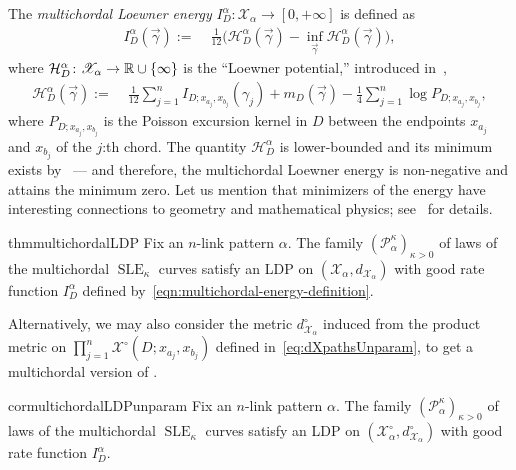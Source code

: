 \documentclass[a4paper, 11pt]{article}
\theoremstyle{definition}
\numberwithin{equation}{section}
\numberwithin{figure}{section}
\newcommand{\SLE}[1][]{\operatorname{SLE}_{#1}}
\newcommand{\lenergy}[2]{I_{#1;#2}}
\newcommand{\mcenergy}[2]{I_{#1}^{#2}}
\newcommand{\potential}[2]{\mathcal H_{#1}^{#2}}
\newcommand{\Pkernel}[2]{P_{#1;#2}}
\newcommand{\Hpaths}[1][]{\mathscr{X}_{#1}} %
\newcommand{\unparampathsH}{\Hpaths[]^\circ}%
\newcommand{\unparampathsHmulti}[1][]{\Hpaths[#1]^\circ}
\newcommand{\dHpaths}[1][]{d_{\!\Hpaths[#1]}}
\newcommand{\dHpathsUnparamMulti}[1][]{d_{\!\Hpaths[#1]}^\circ}
\newcommand{\mcMeasure}[2]{\mathscr{P}_{\!\!#1}^{#2}}
\newcommand{\loopterm}[1]{m_{#1}}
\begin{document}
The \emph{multichordal Loewner energy} $\mcenergy{D}{\alpha} \colon \Hpaths[\alpha] \to [0,+\infty]$ is defined as
\begin{align} \label{eqn:multichordal-energy-definition}
\mcenergy{D}{\alpha}(\vec \gamma) :=\;& \frac{1}{12} \big( \potential{D}{\alpha}(\vec \gamma) - \inf_{\vec\gamma}\potential{D}{\alpha}(\vec\gamma) \big) ,
\end{align}
where $\potential{D}{\alpha} \colon \Hpaths[\alpha] \to \bR\cup\{\infty\}$ is the ``Loewner potential,''
introduced in~\cite[Section~3.2]{Peltola-Wang:LDP},
\begin{align*}
\potential{D}{\alpha}(\vec\gamma) 
:= \;& \frac{1}{12}\sum_{j=1}^n \lenergy{D}{x_{a_j}, x_{b_j}}(\gamma_j) + \loopterm{D}(\vec\gamma) - \frac{1}{4} \sum_{j=1}^n\log \Pkernel{D}{x_{a_j}, x_{b_j}},
\end{align*}
where $\Pkernel{D}{x_{a_j}, x_{b_j}}$ is the Poisson excursion kernel in $D$ between the endpoints $x_{a_j}$ and $x_{b_j}$ of the $j$:th chord. 
The quantity $\potential{D}{\alpha}$ is lower-bounded and its minimum exists by~\cite[Proposition~3.13]{Peltola-Wang:LDP} 
--- and therefore, the multichordal Loewner energy is non-negative and attains the minimum zero.
Let us mention that minimizers of the energy have interesting connections to geometry and mathematical physics;  see~\cite{ABKM:Pole_dynamics_and_an_integral_of_motion_for_multiple_SLE0,Peltola-Wang:LDP} for details.

\begin{restatable}{thm}{multichordalLDP}\label{thm:multichordal-LDP}
Fix an $n$-link pattern $\alpha$. 
The family $(\mcMeasure{\alpha}{\kappa})_{\kappa > 0}$ of laws of the multichordal $\SLE[\kappa]$ curves 
satisfy an LDP on $(\Hpaths[\alpha], \dHpaths[\alpha])$
with good rate function $\mcenergy{D}{\alpha}$ defined by~\eqref{eqn:multichordal-energy-definition}. 
\end{restatable}



Alternatively, we may also consider the metric $\dHpathsUnparamMulti[\alpha]$ induced from the product metric on $\prod_{j=1}^n\unparampathsH(D;x_{a_j},x_{b_j})$ defined in~\eqref{eq:dXpathsUnparam}, to get a multichordal version of .

\begin{restatable}{cor}{multichordalLDPunparam}\label{thm:multichordal-LDP-unparam}
Fix an $n$-link pattern $\alpha$. 
The family $(\mcMeasure{\alpha}{\kappa})_{\kappa > 0}$ of laws of the multichordal $\SLE[\kappa]$ curves 
satisfy an LDP on $(\unparampathsHmulti[\alpha],\dHpathsUnparamMulti[\alpha])$ with good rate function $\mcenergy{D}{\alpha}$. 
\end{restatable}
\end{document}
